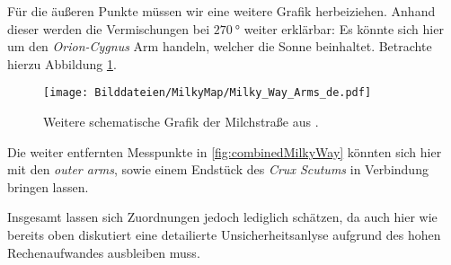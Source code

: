 \documentclass[../../main.tex]{subfiles}
\begin{document}
    Für die äußeren Punkte müssen wir eine weitere Grafik herbeiziehen. Anhand dieser werden die Vermischungen bei $\SI{270}{\degree}$ weiter erklärbar: Es könnte sich hier um den \emph{Orion-Cygnus} Arm handeln, welcher die Sonne beinhaltet. Betrachte hierzu Abbildung \ref{fig:ArmSchematikII}.
    \begin{figure}[H]
        \centering
        \texttt{[image: Bilddateien/MilkyMap/Milky\_Way\_Arms\_de.pdf]}
        \caption{Weitere schematische Grafik der Milchstraße aus \cite{wiki:ArmSchematikII}.}
        \label{fig:ArmSchematikII}
    \end{figure}
    Die weiter entfernten Messpunkte in \ref{fig:combinedMilkyWay} könnten sich hier mit den \emph{outer arms}, sowie einem Endstück des \emph{Crux Scutums} in Verbindung bringen lassen. 

    Insgesamt lassen sich Zuordnungen jedoch lediglich schätzen, da auch hier wie bereits oben diskutiert eine detailierte Unsicherheitsanlyse aufgrund des hohen Rechenaufwandes ausbleiben muss. 
\end{document}
